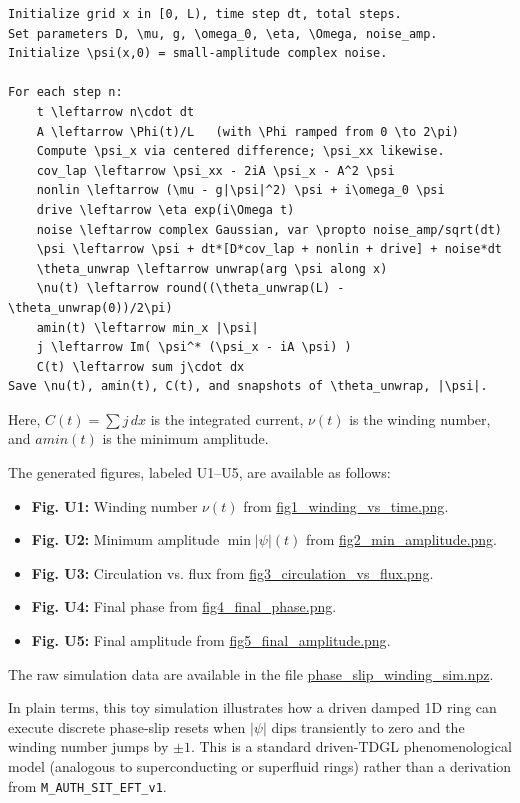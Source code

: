 \begin{verbatim}
Initialize grid x in [0, L), time step dt, total steps.
Set parameters D, \mu, g, \omega_0, \eta, \Omega, noise_amp.
Initialize \psi(x,0) = small-amplitude complex noise.

For each step n:
    t \leftarrow n\cdot dt
    A \leftarrow \Phi(t)/L   (with \Phi ramped from 0 \to 2\pi)
    Compute \psi_x via centered difference; \psi_xx likewise.
    cov_lap \leftarrow \psi_xx - 2iA \psi_x - A^2 \psi
    nonlin \leftarrow (\mu - g|\psi|^2) \psi + i\omega_0 \psi
    drive \leftarrow \eta exp(i\Omega t)
    noise \leftarrow complex Gaussian, var \propto noise_amp/sqrt(dt)
    \psi \leftarrow \psi + dt*[D*cov_lap + nonlin + drive] + noise*dt
    \theta_unwrap \leftarrow unwrap(arg \psi along x)
    \nu(t) \leftarrow round((\theta_unwrap(L) - \theta_unwrap(0))/2\pi)
    amin(t) \leftarrow min_x |\psi|
    j \leftarrow Im( \psi^* (\psi_x - iA \psi) )
    C(t) \leftarrow sum j\cdot dx
Save \nu(t), amin(t), C(t), and snapshots of \theta_unwrap, |\psi|.
\end{verbatim}

Here, $C(t) = \sum j\, dx$ is the integrated current, $\nu(t)$ is the winding number, and $amin(t)$ is the minimum amplitude.

The generated figures, labeled U1--U5, are available as follows:
\begin{itemize}
    \item \textbf{Fig. U1:} Winding number \(\nu(t)\) from \url{fig1_winding_vs_time.png}.
    \item \textbf{Fig. U2:} Minimum amplitude \(\min|\psi|(t)\) from \url{fig2_min_amplitude.png}.
    \item \textbf{Fig. U3:} Circulation vs. flux from \url{fig3_circulation_vs_flux.png}.
    \item \textbf{Fig. U4:} Final phase from \url{fig4_final_phase.png}.
    \item \textbf{Fig. U5:} Final amplitude from \url{fig5_final_amplitude.png}.
\end{itemize}
The raw simulation data are available in the file \url{phase_slip_winding_sim.npz}.

In plain terms, this toy simulation illustrates how a driven damped 1D ring can execute discrete phase-slip resets when $|\psi|$ dips transiently to zero and the winding number jumps by $\pm 1$. This is a standard driven-TDGL phenomenological model (analogous to superconducting or superfluid rings) rather than a derivation from \texttt{M\_AUTH\_SIT\_EFT\_v1}.


